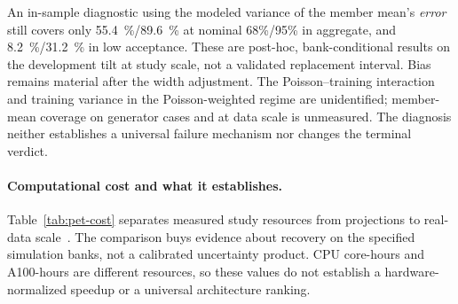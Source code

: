An in-sample diagnostic using the modeled variance of the member mean's \emph{error} still covers only \SI{55.4}{\percent}/\SI{89.6}{\percent} at nominal 68\%/95\% in aggregate, and \SI{8.2}{\percent}/\SI{31.2}{\percent} in low acceptance. These are post-hoc, bank-conditional results on the development tilt at study scale, not a validated replacement interval. Bias remains material after the width adjustment. The Poisson--training interaction and training variance in the Poisson-weighted regime are unidentified; member-mean coverage on generator cases and at data scale is unmeasured. The diagnosis neither establishes a universal failure mechanism nor changes the terminal verdict.

\paragraph{Computational cost and what it establishes.} Table~\ref{tab:pet-cost} separates measured study resources from projections to real-data scale~\cite{PETFinalDesign2026,PETGBDT2026}. The comparison buys evidence about recovery on the specified simulation banks, not a calibrated uncertainty product. CPU core-hours and A100-hours are different resources, so these values do not establish a hardware-normalized speedup or a universal architecture ranking.

